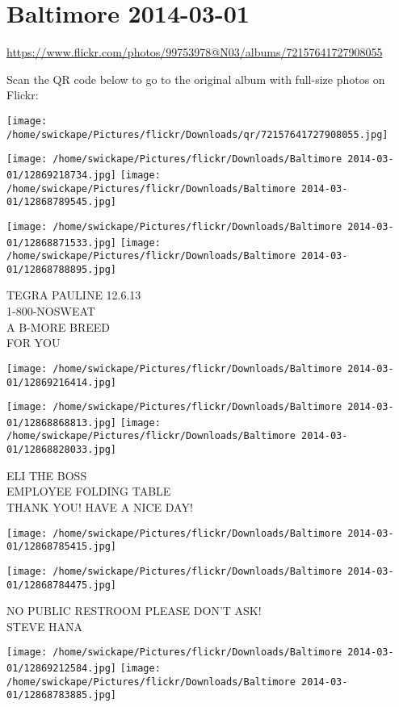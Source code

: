 \documentclass[10pt,letterpaper]{article}
\title{}
\author{}
\date{}
\begin{document}
\section*{Baltimore 2014-03-01}

\url{https://www.flickr.com/photos/99753978@N03/albums/72157641727908055}

Scan the QR code below to go to the original album with full-size photos on Flickr:

\texttt{[image: /home/swickape/Pictures/flickr/Downloads/qr/72157641727908055.jpg]}
\pagebreak

\texttt{[image: /home/swickape/Pictures/flickr/Downloads/Baltimore 2014-03-01/12869218734.jpg]}
\texttt{[image: /home/swickape/Pictures/flickr/Downloads/Baltimore 2014-03-01/12868789545.jpg]}

\texttt{[image: /home/swickape/Pictures/flickr/Downloads/Baltimore 2014-03-01/12868871533.jpg]}
\texttt{[image: /home/swickape/Pictures/flickr/Downloads/Baltimore 2014-03-01/12868788895.jpg]}

TEGRA PAULINE 12.6.13\\
1{-}800{-}NOSWEAT\\
A B{-}MORE BREED\\
FOR YOU
\pagebreak

\texttt{[image: /home/swickape/Pictures/flickr/Downloads/Baltimore 2014-03-01/12869216414.jpg]}

\vspace{0.25in}
\texttt{[image: /home/swickape/Pictures/flickr/Downloads/Baltimore 2014-03-01/12868868813.jpg]}
\texttt{[image: /home/swickape/Pictures/flickr/Downloads/Baltimore 2014-03-01/12868828033.jpg]}

ELI THE BOSS\\
EMPLOYEE FOLDING TABLE\\
THANK YOU!  HAVE A NICE DAY!
\pagebreak

\texttt{[image: /home/swickape/Pictures/flickr/Downloads/Baltimore 2014-03-01/12868785415.jpg]}

\vspace{0.25in}
\texttt{[image: /home/swickape/Pictures/flickr/Downloads/Baltimore 2014-03-01/12868784475.jpg]}

NO PUBLIC RESTROOM PLEASE DON'T ASK!\\
STEVE HANA
\pagebreak

\texttt{[image: /home/swickape/Pictures/flickr/Downloads/Baltimore 2014-03-01/12869212584.jpg]}
\texttt{[image: /home/swickape/Pictures/flickr/Downloads/Baltimore 2014-03-01/12868783885.jpg]}
\end{document}
